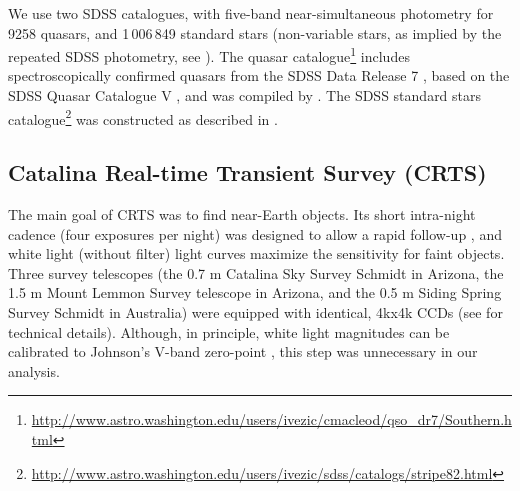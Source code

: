 \documentclass[fleqn,usenatbib]{mnras}
\begin{document}
We use two SDSS catalogues, with five-band near-simultaneous photometry for 9258  quasars,  and 1$\,$006$\,$849 standard stars
(non-variable stars, as implied by the repeated SDSS photometry, see \citealt{ivezic2007}). 
The quasar catalogue\footnote{\url{http://www.astro.washington.edu/users/ivezic/cmacleod/qso_dr7/Southern.html}} includes spectroscopically confirmed quasars from the SDSS Data Release 7 \citep{abazajian2009}, based on the SDSS Quasar Catalogue V \citep{schneider2010}, and was compiled by \cite{macleod2012}. The SDSS standard stars
catalogue\footnote{\url{http://www.astro.washington.edu/users/ivezic/sdss/catalogs/stripe82.html}} 
was constructed as described in \cite{ivezic2007}.


\subsection{Catalina Real-time Transient Survey (CRTS) \label{sec:crtsdata}}
The main goal of CRTS was to find near-Earth objects. Its short intra-night cadence (four exposures per
night) was designed to allow a rapid follow-up \citep{graham2015b}, and white light (without filter) 
light curves maximize the sensitivity for faint objects. Three survey telescopes (the 0.7 m Catalina Sky Survey 
Schmidt in Arizona,  the 1.5 m Mount  Lemmon Survey telescope in Arizona, and the 0.5 m Siding Spring Survey 
Schmidt in Australia) were equipped with identical, 4kx4k CCDs (see \citealt{djorgovski2011a} for technical details).
Although, in principle, white light magnitudes can be calibrated to Johnson's V-band zero-point \citep{drake2013},
this step was unnecessary in our analysis. 
\end{document}
